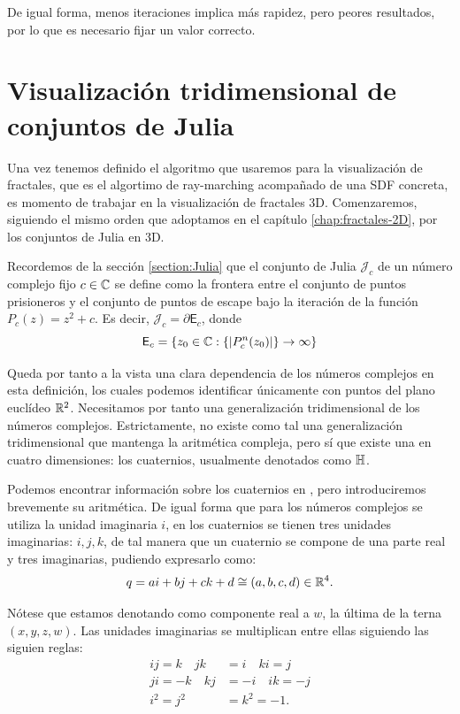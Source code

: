 De igual forma, menos iteraciones implica más rapidez, pero peores resultados, por lo que es necesario fijar un valor correcto.

\section{Visualización tridimensional de conjuntos de Julia}

Una vez tenemos definido el algoritmo que usaremos para la visualización de fractales, que es el algortimo de ray-marching acompañado de una SDF concreta, es momento de trabajar en la visualización de fractales 3D. Comenzaremos, siguiendo el mismo orden que adoptamos en el capítulo \ref{chap:fractales-2D}, por los conjuntos de Julia en 3D.

Recordemos de la sección \ref{section:Julia} que el conjunto de Julia $\mathcal{J}_c$ de un número complejo fijo $c\in\mathbb{C}$ se define como la frontera entre el conjunto de puntos prisioneros y el conjunto de puntos de escape bajo la iteración de la función $P_{c}(z)=z^2+c$. Es decir, $\mathcal{J}_c = \partial \mathsf{E}_c$, donde
\begin{equation}
    \mathsf{E}_c = \{z_0\in\mathbb{C}: \{|P_c^n(z_0)|\}\rightarrow \infty \}
\end{equation}

Queda por tanto a la vista una clara dependencia de los números complejos en esta definición, los cuales podemos identificar únicamente con puntos del plano euclídeo $\mathbb{R}^2$. Necesitamos por tanto una generalización tridimensional de los números complejos. Estrictamente, no existe como tal una generalización tridimensional que mantenga la aritmética compleja, pero sí que existe una en cuatro dimensiones: los cuaternios, usualmente denotados como $\mathbb{H}$.

Podemos encontrar información sobre los cuaternios en \cite{quaternions}, pero introduciremos brevemente su aritmética. De igual forma que para los números complejos se utiliza la unidad imaginaria $i$, en los cuaternios se tienen tres unidades imaginarias: $i,j,k$, de tal manera que un cuaternio se compone de una parte real y tres imaginarias, pudiendo expresarlo como:
\begin{equation}
    q = a i + b j + c k + d \cong (a,b,c,d)\in \mathbb{R}^4.
\end{equation}

Nótese que estamos denotando como componente real a $w$, la última de la terna $(x,y,z,w)$. Las unidades imaginarias se multiplican entre ellas siguiendo las siguien reglas:
\begin{equation}
    \label{eq:relaciones-cuaternios}
    \begin{split}
        ij = k \quad jk &= i \quad ki = j \\
        ji = -k \quad kj &= -i \quad ik = -j \\
        i^2 = j^2 &= k^2 = -1. 
    \end{split}
\end{equation}

